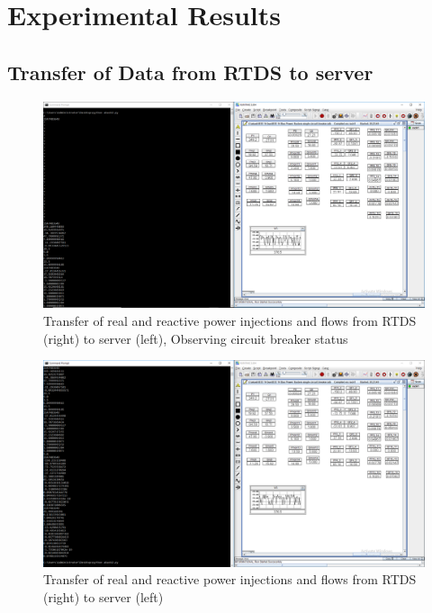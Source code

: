 \chapter{Experimental Results}


\section{Transfer of Data from RTDS to server}
\begin{figure}
\includegraphics[width=\textwidth]{Figures/response_dt_cb.png}
\caption{Transfer of real and reactive power injections and flows from RTDS (right) to server (left), Observing circuit breaker status}
\label{fig:data_transfer_cb_status}
\end{figure}

\begin{figure}
\includegraphics[width=\textwidth]{result_dt2.png}
\caption{Transfer of real and reactive power injections and flows from RTDS (right) to server (left)}
\label{fig:data_transfer}
\end{figure}

